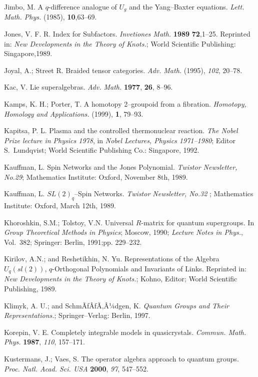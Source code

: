 \documentclass[12pt]{article}
\theoremstyle{plain}
\theoremstyle{definition}
\numberwithin{equation}{section}
\begin{document}
\begin{thebibliography}{99}
Jimbo, M.  A $q$-difference analogue of $U_g$ and the Yang--Baxter equations. \emph{Lett. Math. Phys.} (1985), {\bf 10},63--69. 

Jones, V. F. R. Index for Subfactors. \emph{Invetiones Math.} {\bf 1989} {\bf  72},1--25. Reprinted in: \emph{New Developments in the Theory of Knots.}; World Scientific Publishing: Singapore,1989.

Joyal, A.; Street R.  Braided tensor categories. \emph{Adv. Math.} (1995), \emph{102}, 20--78.

Kac, V.  Lie superalgebras. \emph{Adv. Math.} {\bf 1977}, {\bf 26}, 8--96.

Kamps, K. H.; Porter, T.  A homotopy 2--groupoid from a fibration. \emph{Homotopy, Homology and Applications.} (1999), {\bf 1}, 79--93.

Kapitsa,  P. L.  Plasma and the controlled thermonuclear reaction. \emph{The Nobel Prize lecture in Physics 1978}, in \emph{Nobel Lectures, Physics 1971--1980}; Editor S.~Lundqvist; World Scientific Publishing Co.: Singapore, 1992.

Kauffman, L. Spin Networks and the Jones Polynomial. \emph{Twistor Newsletter, No.29}; Mathematics Institute: Oxford, November 8th, 1989.

Kauffman, L.  $SL(2)_q$--Spin Networks. \emph{Twistor Newsletter, No.32 }; Mathematics Institute: Oxford, March 12th, 1989.

Khoroshkin, S.M.; Tolstoy, V.N. Universal $R$-matrix for quantum supergroups.  In {\em Group Theoretical Methods in Physics}; Moscow, 1990; {\em Lecture Notes in Phys.}, Vol.~382; Springer: Berlin, 1991;pp. 229--232.

Kirilov, A.N.; and Reshetikhin, N. Yu. Representations of the Algebra $U_q(sl(2))$, $q$-Orthogonal Polynomials and Invariants of Links. Reprinted in: {\em New Developments in the Theory of Knots.}; Kohno, Editor; World Scientific Publishing, 1989.

Klimyk, A. U.; and SchmÃƒÂƒÃ‚Â¼dgen, K. {\em  Quantum Groups and Their Representations.}; Springer--Verlag: Berlin, 1997.

Korepin, V. E.  Completely integrable models in quasicrystals. {\em Commun. Math. Phys.}  {\bf 1987}, {\em 110}, 157--171.

Kustermans, J.; Vaes, S. The operator algebra approach to quantum groups. {\em Proc. Natl. Acad. Sci. USA} {\bf 2000}, {\em 97}, 547--552.


\end{thebibliography}
\end{document}

